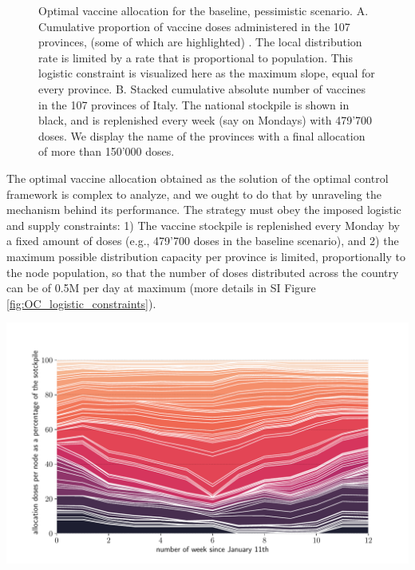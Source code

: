 \begin{figure}[!ht]
    \caption[Optimal vaccine allocation for the baseline, pessimistic scenario. ]{Optimal vaccine allocation for the baseline, pessimistic scenario. \textsc{A.} Cumulative proportion of vaccine doses administered in the 107 provinces, (some of which are highlighted) . The local distribution rate is limited by a rate that is proportional to population. This logistic constraint is visualized here as the maximum slope, equal for every province.
    \textsc{B.} Stacked cumulative absolute number of vaccines in the 107 provinces of Italy. The national stockpile is shown in black, and is replenished every week (say on Mondays) with 479'700 doses. We display the name of the provinces with a final allocation of more than 150'000 doses.}
    \label{fig:OC_stackplot}
\end{figure}

The optimal vaccine allocation obtained as the solution of the optimal control framework is complex to analyze, and we ought to do that by unraveling the mechanism behind its performance.
The strategy must obey the imposed logistic and supply constraints: 1) The vaccine stockpile is replenished every Monday by a fixed amount of doses (e.g., 479'700 doses in the baseline scenario), and 2) the maximum possible distribution capacity per province is limited, proportionally to the node population, so that the number of doses distributed across the country can be of 0.5M per day at maximum (more details in SI Figure \ref{fig:OC_logistic_constraints}). \begin{marginfigure}[-10\baselineskip]
    \centering
    \includegraphics{fig_italy-ocp/figuresSI/SI_ts_optimal_stackplot_proportional.pdf}
    \label{fig:OC_temporal_alloaction}
\end{marginfigure}

